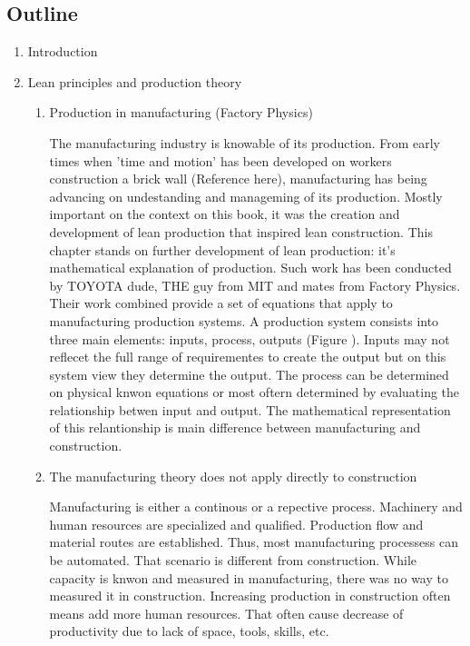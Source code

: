\documentclass{article}
\begin{document}
\subsection{Outline}
\label{sec:org821f8d3}
\begin{enumerate}
\item Introduction
\label{sec:orgf3acf4d}
\item Lean principles and production theory
\label{sec:org87b0b71}
\begin{enumerate}
\item Production in manufacturing (Factory Physics)
\label{sec:orgba34a99}

 The manufacturing industry is knowable of its production.
 From early times when 'time and motion' has been developed on workers construction a brick wall (Reference here), manufacturing has being advancing on undestanding and manageming of its production.
 Mostly important on the context on this book, it was the creation and development of lean production that inspired lean construction.
 This chapter stands on further development of lean production: it's mathematical explanation of production.
Such work has been conducted by TOYOTA dude, THE guy from MIT and mates from Factory Physics.
Their work combined provide a set of equations that apply to manufacturing production systems.
A production system consists into three main elements: inputs, process, outputs (Figure ).
Inputs may not reflecet the full range of requirementes to create the output but on this system view they determine the output.
The process can be determined on physical knwon equations or most oftern determined by evaluating the relationship betwen input and output.
The mathematical representation of this relantionship is main difference between manufacturing and construction.
\item The manufacturing theory does not apply directly to construction
\label{sec:orgc52c3df}

Manufacturing is either a continous or a repective process.
Machinery and human resources are specialized and qualified.
Production flow and material routes are established. 
Thus, most manufacturing processess can be automated.
That scenario is different from construction.
While capacity is knwon and measured in manufacturing, there was no way to measured it in construction.
Increasing production in construction often means add more human resources.
That often cause decrease of productivity due to lack of space, tools, skills, etc.
\end{enumerate}


\end{enumerate}
\end{document}
